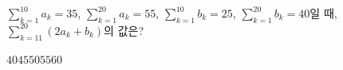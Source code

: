 \hspace*{2mm}\begin{minipage}[t]{\dimexpr\linewidth-2mm\relax}\vspace{0pt}
$\displaystyle\sum_{k=1}^{10}a_k=35$, $\displaystyle\sum_{k=1}^{20}a_k=55$, $\displaystyle\sum_{k=1}^{10}b_k=25$, $\displaystyle\sum_{k=1}^{20}b_k=40$일 때, $\displaystyle\sum_{k=11}^{20}(2a_k+b_k)$의 값은?
\begin{choices32}{$40$}{$45$}{$50$}{$55$}{$60$}\end{choices32}\end{minipage}
